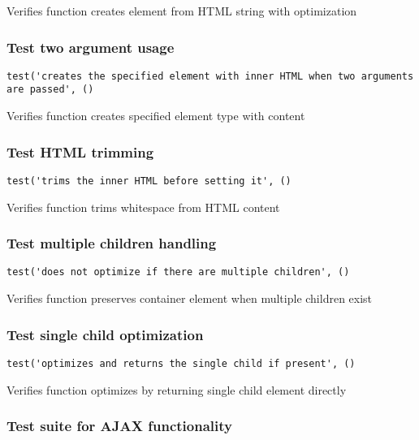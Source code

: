 \documentclass[a4paper]{article}
\begin{document}
Verifies function creates element from HTML string with optimization

\hypertarget{toc68}{}
\subsubsection{Test two argument usage}

\begin{lstlisting}
test('creates the specified element with inner HTML when two arguments are passed', ()
\end{lstlisting}

Verifies function creates specified element type with content

\hypertarget{toc69}{}
\subsubsection{Test HTML trimming}

\begin{lstlisting}
test('trims the inner HTML before setting it', ()
\end{lstlisting}

Verifies function trims whitespace from HTML content

\hypertarget{toc70}{}
\subsubsection{Test multiple children handling}

\begin{lstlisting}
test('does not optimize if there are multiple children', ()
\end{lstlisting}

Verifies function preserves container element when multiple children exist

\hypertarget{toc71}{}
\subsubsection{Test single child optimization}

\begin{lstlisting}
test('optimizes and returns the single child if present', ()
\end{lstlisting}

Verifies function optimizes by returning single child element directly

\hypertarget{toc72}{}
\subsubsection{Test suite for AJAX functionality}
\end{document}
